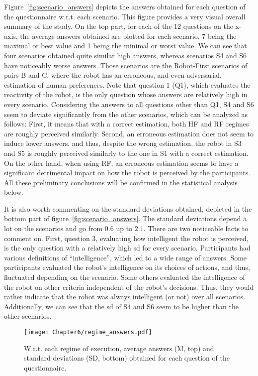 Figure~\ref{fig:scenario_answers} depicts the answers obtained for each question of the questionnaire w.r.t. each scenario. This figure provides a very visual overall summary of the study. On the top part, for each of the 12 questions on the x-axis, the average answers obtained are plotted for each scenario, 7 being the maximal or best value and 1 being the minimal or worst value. 
We can see that four scenarios obtained quite similar high answers, whereas scenarios S4 and S6 have noticeably worse answers. Those scenarios are the Robot-First scenarios of pairs B and C, where the robot has an erroneous, and even adversarial, estimation of human preferences. 
Note that question 1 (Q1), which evaluates the reactivity of the robot, is the only question whose answers are relatively high in every scenario.
Considering the answers to all questions other than Q1, S4 and S6 seem to deviate significantly from the other scenarios, which can be analyzed as follows:
First, it means that with a correct estimation, both HF and RF regimes are roughly perceived similarly. 
Second, an erroneous estimation does not seem to induce lower answers, and thus, despite the wrong estimation, the robot in S3 and S5 is roughly perceived similarly to the one in S1 with a correct estimation.
On the other hand, when using RF, an erroneous estimation seems to have a significant detrimental impact on how the robot is perceived by the participants.
All these preliminary conclusions will be confirmed in the statistical analysis below.

It is also worth commenting on the standard deviations obtained, depicted in the bottom part of figure~\ref{fig:scenario_answers}. The standard deviations depend a lot on the scenarios and go from $0.6$ up to $2.1$. There are two noticeable facts to comment on.
First, question 3, evaluating how intelligent the robot is perceived, is the only question with a relatively high \acrshort{sd} for every scenario. Participants had various definitions of ``intelligence'', which led to a wide range of answers. Some participants evaluated the robot's intelligence on its choices of actions, and thus, fluctuated depending on the scenario. Some others evaluated the intelligence of the robot on other criteria independent of the robot's decisions. Thus, they would rather indicate that the robot was always intelligent (or not) over all scenarios.
Additionally, we can see that the \acrshort{sd} of S4 and S6 seem to be higher than the other scenarios.

\begin{figure}[h]
    \center
    \texttt{[image: Chapter6/regime\_answers.pdf]}
    \caption{W.r.t. each regime of execution, average answers (M, top) and standard deviations (SD, bottom) obtained for each question of the questionnaire.}
    \label{fig:regime_answers}
\end{figure}

